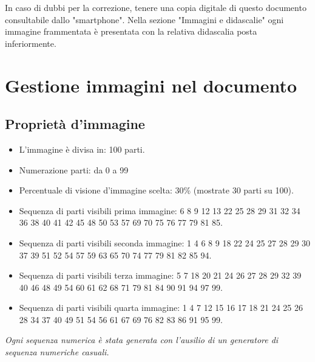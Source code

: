 \documentclass[hidelinks,12pt,a4paper]{article}
\begin{document}
	
	\vspace*{\fill}
	\centering
	\fboxrule=2pt
	\fbox
	{
		\begin{minipage}{\linewidth}
			In caso di dubbi per la correzione, tenere una copia digitale di questo documento consultabile dallo "smartphone". Nella sezione "Immagini e didascalie" ogni immagine frammentata è presentata con la relativa didascalia posta inferiormente.
		\end{minipage}
	}

	\newpage
	\section{Gestione immagini nel documento}
	
	\newline
	
	\subsection{Proprietà d'immagine}
	\begin{itemize}
		\item L'immagine è divisa in: 100 parti.
		\item Numerazione parti: da 0 a 99
		\item Percentuale di visione d'immagine scelta: 30\% (mostrate 30 parti su 100).
		\item Sequenza di parti visibili prima immagine:  6 8 9 12 13 22 25 28 29 31 32 34 36 38 40 41 42 45 48 50 53 57 69 70 75 76 77 79 81 85.
		\item Sequenza di parti visibili seconda immagine:  1 4 6 8 9 18 22 24 25 27 28 29 30 37 39 51 52 54 57 59 63 65 70 74 77 79 81 82 85 94.
		\item Sequenza di parti visibili terza immagine:  5 7 18 20 21 24 26 27 28 29 32 39 40 46 48 49 54 60 61 62 68 71 79 81 84 90 91 94 97 99.
		\item Sequenza di parti visibili quarta immagine:  1 4 7 12 15 16 17 18 21 24 25 26 28 34 37 40 49 51 54 56 61 67 69 76 82 83 86 91 95 99.
	\end{itemize}
	\textit{Ogni sequenza numerica è stata generata con l'ausilio di un generatore di sequenza numeriche casuali.}
\end{document}
